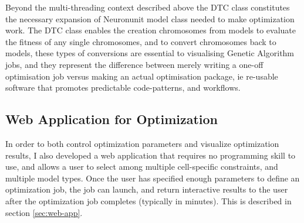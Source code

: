 Beyond the multi-threading context described above the DTC class constitutes the necessary expansion of Neuronunit model class needed to make optimization work. The DTC class enables the creation chromosomes from models to evaluate the fitness of any single chromosomes, and to convert chromosomes back to models, these types of conversions are essential to visualising Genetic Algorithm jobs, and they represent the difference between merely writing a one-off optimisation job versus making an actual optimisation package, ie re-usable software that promotes predictable code-patterns, and workflows. 






% 

\subsection{Web Application for Optimization}
In order to both control optimization parameters and visualize optimization results, I also developed a web application that requires no programming skill to use, and allows a user to select among multiple cell-specific constraints, and multiple model types.
Once the user has specified enough parameters to define an optimization job, the job can launch, and return interactive results to the user after the optimization job completes (typically in minutes).
This is described in section \ref{sec:web-app}.